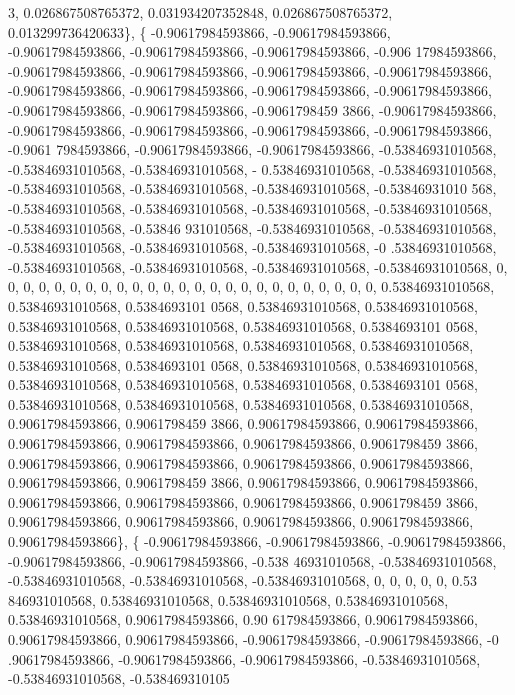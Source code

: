 \begin{DoxyCode}
      3, 0.026867508765372, 0.031934207352848, 0.026867508765372, 0.013299736420633\},
    \{ -0.90617984593866, -0.90617984593866, -0.90617984593866, -0.90617984593866, -0.90617984593866, -0.906
      17984593866, -0.90617984593866, -0.90617984593866, -0.90617984593866, -0.90617984593866, -0.90617984593866, 
      -0.90617984593866, -0.90617984593866, -0.90617984593866, -0.90617984593866, -0.90617984593866, -0.9061798459
      3866, -0.90617984593866, -0.90617984593866, -0.90617984593866, -0.90617984593866, -0.90617984593866, -0.9061
      7984593866, -0.90617984593866, -0.90617984593866, -0.53846931010568, -0.53846931010568, -0.53846931010568, -
      0.53846931010568, -0.53846931010568, -0.53846931010568, -0.53846931010568, -0.53846931010568, -0.53846931010
      568, -0.53846931010568, -0.53846931010568, -0.53846931010568, -0.53846931010568, -0.53846931010568, -0.53846
      931010568, -0.53846931010568, -0.53846931010568, -0.53846931010568, -0.53846931010568, -0.53846931010568, -0
      .53846931010568, -0.53846931010568, -0.53846931010568, -0.53846931010568, -0.53846931010568, 0, 0, 0, 0, 0, 
      0, 0, 0, 0, 0, 0, 0, 0, 0, 0, 0, 0, 0, 0, 0, 0, 0, 0, 0, 0, 0.53846931010568, 0.53846931010568, 0.5384693101
      0568, 0.53846931010568, 0.53846931010568, 0.53846931010568, 0.53846931010568, 0.53846931010568, 0.5384693101
      0568, 0.53846931010568, 0.53846931010568, 0.53846931010568, 0.53846931010568, 0.53846931010568, 0.5384693101
      0568, 0.53846931010568, 0.53846931010568, 0.53846931010568, 0.53846931010568, 0.53846931010568, 0.5384693101
      0568, 0.53846931010568, 0.53846931010568, 0.53846931010568, 0.53846931010568, 0.90617984593866, 0.9061798459
      3866, 0.90617984593866, 0.90617984593866, 0.90617984593866, 0.90617984593866, 0.90617984593866, 0.9061798459
      3866, 0.90617984593866, 0.90617984593866, 0.90617984593866, 0.90617984593866, 0.90617984593866, 0.9061798459
      3866, 0.90617984593866, 0.90617984593866, 0.90617984593866, 0.90617984593866, 0.90617984593866, 0.9061798459
      3866, 0.90617984593866, 0.90617984593866, 0.90617984593866, 0.90617984593866, 0.90617984593866\},
    \{ -0.90617984593866, -0.90617984593866, -0.90617984593866, -0.90617984593866, -0.90617984593866, -0.538
      46931010568, -0.53846931010568, -0.53846931010568, -0.53846931010568, -0.53846931010568, 0, 0, 0, 0, 0, 0.53
      846931010568, 0.53846931010568, 0.53846931010568, 0.53846931010568, 0.53846931010568, 0.90617984593866, 0.90
      617984593866, 0.90617984593866, 0.90617984593866, 0.90617984593866, -0.90617984593866, -0.90617984593866, -0
      .90617984593866, -0.90617984593866, -0.90617984593866, -0.53846931010568, -0.53846931010568, -0.538469310105

\end{DoxyCode}
